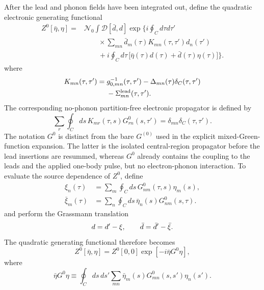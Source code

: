 \documentclass[
 reprint,
 superscriptaddress,
 amsmath,amssymb,
 aps,prb,
 longbibliography,
 floatfix
]{revtex4-2}
\begin{document}
After the lead and phonon fields have been integrated out, define the quadratic electronic generating functional
\begin{equation*}
\begin{aligned}
Z^0[\bar\eta,\eta]
={}&
\mathcal N_0
\int
\mathcal D[\bar d,d]
\exp\Bigg\{
i
\oint_C d\tau d\tau'
\\
&\qquad\times
\sum_{mn} \bar d_m(\tau)
K_{mn}(\tau,\tau')
d_n(\tau')
\\
&\qquad+
i
\oint_C d\tau\,
\Big[
\bar\eta(\tau)d(\tau)
+
\bar d(\tau)\eta(\tau)
\Big]
\Bigg\}.
\end{aligned}
\end{equation*}
where
\begin{align*}
K_{mn}(\tau,\tau')
={}&
g_{0,mn}^{-1}(\tau,\tau')
-\Delta_{mn}(\tau)\delta_C(\tau,\tau')
\\
&-
\Sigma_{mn}^{\rm lead}(\tau,\tau').
\end{align*}
The corresponding no-phonon partition-free electronic propagator is defined by
\begin{equation*}
\sum_r
\oint_C ds\,
K_{mr}(\tau,s)
G_{rn}^{0}(s,\tau')
=
\delta_{mn}\delta_C(\tau,\tau').
\end{equation*}
The notation \(G^0\) is distinct from the bare \(G^{(0)}\) used in the explicit mixed-Green-function expansion. The latter is the isolated central-region propagator before the lead insertions are resummed, whereas \(G^0\) already contains the coupling to the leads and the applied one-body pulse, but no electron-phonon interaction. To evaluate the source dependence of \(Z^0\), define
\begin{align*}
\xi_n(\tau)
&=
\sum_m
\oint_C ds\,
G_{nm}^{0}(\tau,s)\eta_m(s),
\\
\bar\xi_m(\tau)
&=
\sum_n
\oint_C ds\,
\bar\eta_n(s)G_{nm}^{0}(s,\tau).
\end{align*}
and perform the Grassmann translation
\begin{equation}
d=d'-\xi,
\notag\qquad
\bar d=\bar d'-\bar\xi.
\label{eq:d-source-shift}
\end{equation}
The quadratic generating functional therefore becomes
\begin{equation*}
Z^0[\bar\eta,\eta]
=
Z^0[0,0]
\exp\!\left[
-i\bar\eta G^0\eta
\right],
\end{equation*}
where
\begin{equation*}
\bar\eta G^0\eta
\equiv
\oint_C ds\,ds'
\sum_{mn}
\bar\eta_m(s)
G_{mn}^{0}(s,s')
\eta_n(s').
\end{equation*}
\end{document}
